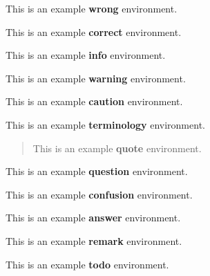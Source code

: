 
\begin{wrong}
  This is an example \textbf{wrong} environment.
\end{wrong}

\begin{correct}
  This is an example \textbf{correct} environment.
\end{correct}

\begin{info}
  This is an example \textbf{info} environment.
\end{info}

\begin{warning}
  This is an example \textbf{warning} environment.
\end{warning}

\begin{caution}
  This is an example \textbf{caution} environment.
\end{caution}

\begin{terminology}
  This is an example \textbf{terminology} environment.
\end{terminology}

\begin{quote}
  This is an example \textbf{quote} environment.
\end{quote}

\begin{question}
  This is an example \textbf{question} environment.
\end{question}

\begin{confusion}
  This is an example \textbf{confusion} environment.
\end{confusion}

\begin{answer}
  This is an example \textbf{answer} environment.
\end{answer}

\begin{remark}
  This is an example \textbf{remark} environment.
\end{remark}

\begin{todo}
  This is an example \textbf{todo} environment.
\end{todo}

